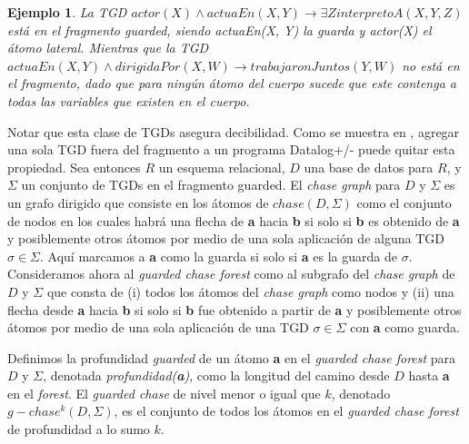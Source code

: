 \documentclass[11pt,a4paper,twoside]{tesis}
\newtheorem{exmp}{Ejemplo}
\begin{document}
\begin{exmp}\label{ejemplo_guarded}
    La TGD $actor(X) \land actuaEn(X, Y) \rightarrow \exists Z interpretoA(X, Y, Z)$ está en el fragmento \textit{guarded}, siendo \textit{actuaEn(X, Y)} la guarda y \textit{actor(X)} el átomo lateral. Mientras que la TGD $actuaEn(X, Y) \land dirigidaPor(X, W) \rightarrow trabajaronJuntos(Y, W)$ no está en el fragmento, dado que para ningún átomo del cuerpo sucede que este contenga a todas las variables que existen en el cuerpo. 
\end{exmp}
Notar que esta clase de TGDs asegura decibilidad. Como se muestra en \cite{cali}, agregar una sola TGD fuera del fragmento a un programa Datalog+/- puede quitar esta propiedad.
Sea entonces $R$ un esquema relacional, $D$ una base de datos para $R$, y $\Sigma$ un conjunto de TGDs en el fragmento guarded. El \textit{chase graph} para $D$ y $\Sigma$ es un grafo dirigido que consiste en los átomos de $chase(D,\Sigma)$ como el conjunto de nodos en los cuales habrá una flecha de \textbf{a} hacia \textbf{b} si solo si \textbf{b} es obtenido de \textbf{a} y posiblemente otros átomos por medio de una sola aplicación de alguna TGD $\sigma \in \Sigma$. Aquí marcamos a \textbf{a} como la guarda si solo si \textbf{a} es la guarda de $\sigma$. Consideramos ahora al \textit{guarded chase forest} como al subgrafo del \textit{chase graph} de $D$ y $\Sigma$ que consta de (i) todos los átomos del \textit{chase graph} como nodos y (ii) una flecha desde \textbf{a} hacia \textbf{b} si solo si \textbf{b} fue obtenido a partir de \textbf{a} y posiblemente otros átomos por medio de una sola aplicación de una TGD $\sigma \in \Sigma$ con \textbf{a} como guarda.

Definimos la profundidad \textit{guarded} de un átomo \textbf{a} en el \textit{guarded chase forest} para $D$ y $\Sigma$, denotada \textit{profundidad(\textbf{a})}, como la longitud del camino desde $D$ hasta \textbf{a} en el \textit{forest}. El \textit{guarded chase} de nivel menor o igual que $k$, denotado $g-chase^k(D, \Sigma)$, es el conjunto de todos los átomos en el \textit{guarded chase forest} de profundidad a lo sumo $k$.
\end{document}
